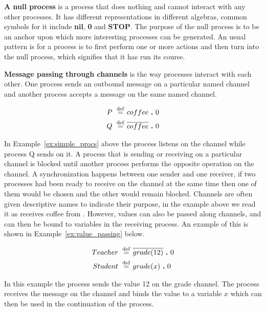 	\textbf{A null process} is a process that does nothing and cannot interact 
	with any other processes. It has different representations in different 
	algebras, common symbols for it include \textbf{nil}, \textbf{0} and 
	\textbf{STOP}. The purpose of the null process is to be an anchor upon which 
	more interesting processes can be generated. An usual pattern is for a 
	process is to first perform one or more actions and then turn into the null 
	process, which signifies that it has run its course.
	
	\textbf{Message passing through channels} is the way processes interact with 
	each other. One process sends an outbound message on a particular named 
	channel and another process accepts a message on the same named channel. 

	\begin{Exa}
	\label{ex:simple_procs}
	\begin{align*}
			P \ \stackrel{\mathrm{def}}{=}\  & coffee \ \textbf{.}\  0 \\
			Q \ \stackrel{\mathrm{def}}{=}\  & \overline{coffee} \ \textbf{.}\  0 
	\end{align*}	
	\end{Exa}
				
	In Example~\ref{ex:simple_procs} above the process  listens on the 
	 channel while process Q sends on it. A process that is 
	sending or receiving on a particular channel is blocked until another process
	performs the opposite operation on the channel. A synchronization happens 
	between one sender and one receiver, if two processes had been ready to 
	receive on the  channel at the same time then one of them 
	would be chosen and the other would remain blocked. Channels are often given 
	descriptive names to indicate their purpose, in the example above we read it 
	as  receives coffee from . However, values can also be 
	passed along channels, and can then be bound to variables in the receiving 
	process. An example of this is shown in Example~\ref{ex:value_passing} below.
	
	\begin{Exa}\label{ex:value_passing}
	\begin{align*}
			Teacher \ \stackrel{\mathrm{def}}{=}\  & \overline{grade(12)} \ \textbf{.}\  0 \\
			Student \ \stackrel{\mathrm{def}}{=}\  & grade(x) \ \textbf{.}\  0 
	\end{align*}	
	\end{Exa}

	In this example the  process sends the value 12 on the 
	\textsf{grade} channel. The  process receives the message on 
	the channel and binds the value to a variable $x$ which can then be used in 
	the continuation of the process.
	
